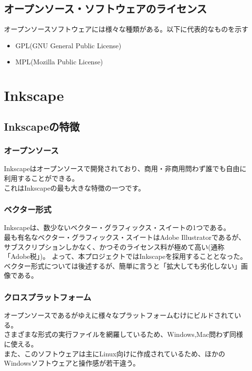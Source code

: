 \documentclass{ltjsarticle}
\begin{document}
\subsection{オープンソース・ソフトウェアのライセンス}
オープンソースソフトウェアには様々な種類がある。以下に代表的なものを示す
\begin{itemize}
    \item GPL(GNU General Public License)
    \item MPL(Mozilla Public License)
\end{itemize}
\section{Inkscape}
\subsection{Inkscapeの特徴}
\subsubsection{オープンソース}
Inkscapeはオープンソースで開発されており、商用・非商用問わず誰でも自由に利用することができる。\\
これはInkscapeの最も大きな特徴の一つです。
\subsubsection{ベクター形式}
Inkscapeは、数少ないベクター・グラフィックス・スイートの1つである。\\
最も有名なベクター・グラフィックス・スイートはAdobe Illustratorであるが、サブスクリプションしかなく、かつそのライセンス料が極めて高い(通称「Adobe税」)。
よって、本プロジェクトではInkscapeを採用することとなった。\\
ベクター形式については後述するが、簡単に言うと「拡大しても劣化しない」画像である。\\
\subsubsection{クロスプラットフォーム}
オープンソースであるがゆえに様々なプラットフォームむけにビルドされている。\\
さまざまな形式の実行ファイルを網羅しているため、Windows,Mac問わず同様に使える。\\
また、このソフトウェアは主にLinux向けに作成されているため、ほかのWindowsソフトウェアと操作感が若干違う。
\end{document}
